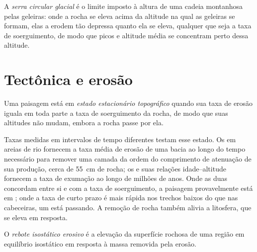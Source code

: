 \begin{definition}\label{def:b3:quantitative-geomorphology:buzzsaw}
A \emph{serra circular glacial} é o limite imposto à
altura de uma cadeia montanhosa pelas geleiras: onde a rocha se eleva acima da altitude
na qual as geleiras se formam, elas a erodem tão depressa quanto ela se eleva, qualquer que seja a
taxa de soerguimento, de modo que picos e altitude média se concentram perto dessa altitude.
\end{definition}

\section{Tectônica e erosão}\label{sec:b3:quantitative-geomorphology:tectonics}

\begin{definition}\label{def:b3:quantitative-geomorphology:steady-state}
Uma paisagem está em \emph{estado estacionário topográfico}
quando sua taxa de erosão iguala em toda parte a taxa de soerguimento da rocha, de modo
que suas altitudes não mudam, embora a rocha passe por ela.
\end{definition}

Taxas medidas em intervalos de tempo diferentes testam esse estado. Os 
em areias de rio fornecem a taxa média de erosão de uma bacia ao longo do tempo
necessário para remover uma camada da ordem do comprimento de atenuação de sua
produção, cerca de \qty{55}{cm} de rocha; os  e suas relações idade--altitude fornecem a
taxa de exumação ao longo de milhões de anos. Onde as duas concordam entre si
e com a taxa de soerguimento, a paisagem provavelmente está em ; onde
a taxa de curto prazo é mais rápida nos trechos baixos do que nas cabeceiras,
um  está passando. A remoção de rocha também alivia a
litosfera, que se eleva em resposta.

\begin{definition}\label{def:b3:quantitative-geomorphology:rebound}
O \emph{rebote isostático erosivo} é
a elevação da superfície rochosa de uma região em equilíbrio isostático em
resposta à massa removida pela erosão.
\end{definition}

